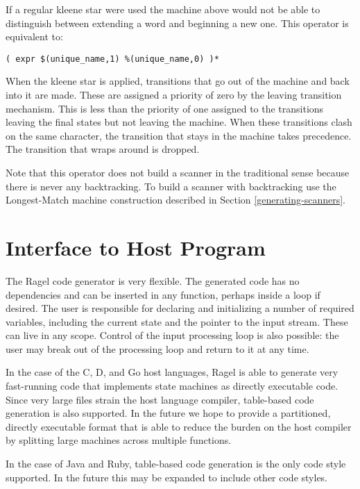 \documentclass[letterpaper,11pt,oneside]{book}
\newcommand{\verbspace}{\vspace{10pt}}
\begin{document}
If a regular kleene star were used the machine above would not be able to
distinguish between extending a word and beginning a new one.  This operator is
equivalent to:

\begin{verbatim}
( expr $(unique_name,1) %(unique_name,0) )*
\end{verbatim}
\verbspace

When the kleene star is applied, transitions that go out of the machine and
back into it are made. These are assigned a priority of zero by the leaving 
transition mechanism. This is less than the priority of one assigned to the
transitions leaving the final states but not leaving the machine. When 
these transitions clash on the same character, the 
transition that stays in the machine takes precedence.  The transition
that wraps around is dropped.

Note that this operator does not build a scanner in the traditional sense
because there is never any backtracking. To build a scanner with backtracking
use the Longest-Match machine construction described in Section
\ref{generating-scanners}.

\chapter{Interface to Host Program}

The Ragel code generator is very flexible. The generated code has no
dependencies and can be inserted in any function, perhaps inside a loop if
desired.  The user is responsible for declaring and initializing a number of
required variables, including the current state and the pointer to the input
stream. These can live in any scope. Control of the input processing loop is
also possible: the user may break out of the processing loop and return to it
at any time.

In the case of the C, D, and Go host languages, Ragel is able to generate very
fast-running code that implements state machines as directly executable code.
Since very large files strain the host language compiler, table-based code
generation is also supported. In the future we hope to provide a partitioned,
directly executable format that is able to reduce the burden on the host
compiler by splitting large machines across multiple functions.

In the case of Java and Ruby, table-based code generation is the only code
style supported. In the future this may be expanded to include other code
styles.
\end{document}
